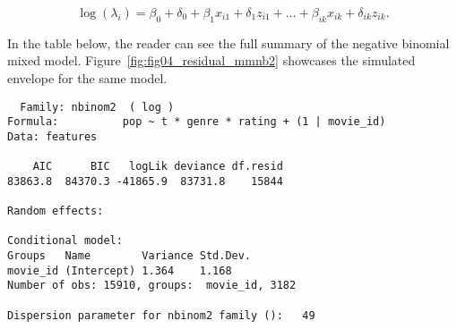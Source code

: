 $$
\log(\lambda_i) = \beta_0 + \delta_0 + \beta_1 x_{i1} + \delta_1 z_{i1} + \dots + \beta_{ik} x_{ik} + \delta_{ik} z_{ik}.
$$

In the table below, the reader can see the full summary of the negative binomial
mixed model. Figure~\ref{fig:fig04_residual_mmnb2} showcases the simulated
envelope for the same model.

\begin{verbatim}
  Family: nbinom2  ( log )
Formula:          pop ~ t * genre * rating + (1 | movie_id)
Data: features

    AIC      BIC   logLik deviance df.resid
83863.8  84370.3 -41865.9  83731.8    15844

Random effects:

Conditional model:
Groups   Name        Variance Std.Dev.
movie_id (Intercept) 1.364    1.168
Number of obs: 15910, groups:  movie_id, 3182

Dispersion parameter for nbinom2 family ():   49


\end{verbatim}
